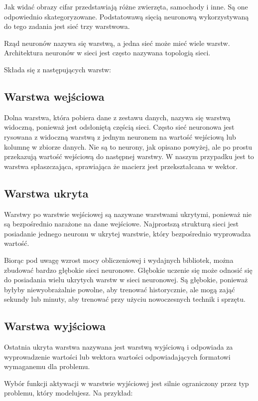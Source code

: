 \documentclass{article}
\begin{document}
Jak widać obrazy cifar przedstawiają różne zwierzęta, samochody i inne. Są one odpowiednio skategoryzowane.
Podstatowawą sięcią neuronową wykorzystywaną do tego zadania jest sieć trzy warstwowa.

Rząd neuronów nazywa się warstwą, a jedna sieć może mieć wiele warstw.
Architektura neuronów w sieci jest często nazywana topologią sieci.

Składa się z następujących warstw:
\subsection{Warstwa wejściowa}

Dolna warstwa, która pobiera dane z zestawu danych, nazywa się warstwą widoczną,
ponieważ jest odsłoniętą częścią sieci. Często sieć neuronowa jest rysowana
z widoczną warstwą z jednym neuronem na wartość wejściową lub kolumnę
w zbiorze danych. Nie są to neurony, jak opisano powyżej, ale po prostu
przekazują wartość wejściową do następnej warstwy.
W naszym przypadku jest to warstwa spłaszczająca,
sprawiająca że macierz jest przekształcana w wektor.

\subsection{Warstwa ukryta}

Warstwy po warstwie wejściowej są nazywane warstwami ukrytymi,
ponieważ nie są bezpośrednio narażone na dane wejściowe.
Najprostszą strukturą sieci jest posiadanie jednego neuronu w ukrytej warstwie,
który bezpośrednio wyprowadza wartość.

Biorąc pod uwagę wzrost mocy obliczeniowej i wydajnych bibliotek,
można zbudować bardzo głębokie sieci neuronowe. Głębokie uczenie się może odnosić się
do posiadania wielu ukrytych warstw w sieci neuronowej. Są głębokie, ponieważ byłyby
niewyobrażalnie powolne, aby trenować historycznie, ale mogą zająć sekundy lub minuty,
aby trenować przy użyciu nowoczesnych technik i sprzętu.

\subsection{Warstwa wyjściowa}

Ostatnia ukryta warstwa nazywana jest warstwą wyjściową i odpowiada za wyprowadzenie
wartości lub wektora wartości odpowiadających formatowi wymaganemu dla problemu.

Wybór funkcji aktywacji w warstwie wyjściowej jest silnie ograniczony przez typ problemu,
który modelujesz. Na przykład:
\end{document}
